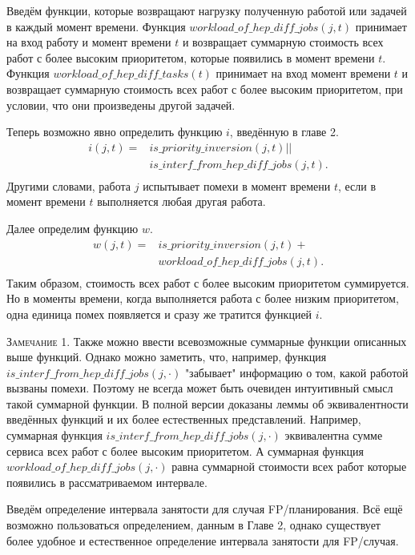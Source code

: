 Введём функции, которые возвращают нагрузку полученную работой или задачей
  в каждый момент времени. Функция $workload\_of\_hep\_diff\_jobs(j,t)$ принимает на вход
  работу и момент времени $t$ и возвращает суммарную стоимость всех работ с более
  высоким приоритетом, которые появились в момент времени $t$.
  Функция $workload\_of\_hep\_diff\_tasks(t)$ принимает на вход момент времени $t$ и возвращает
  суммарную стоимость всех работ с более высоким приоритетом, при условии, что они произведены другой задачей.

Теперь возможно явно определить функцию $i$, введённую в главе 2.
  \begin{align*} i(j,t) = & is\_priority\_inversion(j, t) || \\ & is\_interf\_from\_hep\_diff\_jobs(j,t).\\
  \end{align*}
  Другими словами, работа $j$ испытывает помехи в момент времени $t$, если в момент времени
  $t$ выполняется любая другая работа.

Далее определим функцию $w$.
\begin{align*} w(j,t) = & is\_priority\_inversion(j, t) + \\ & workload\_of\_hep\_diff\_jobs(j,t).\\
\end{align*}
  Таким образом, стоимость всех работ с более высоким приоритетом суммируется.
  Но в моменты времени, когда выполняется работа с более низким приоритетом,
  одна единица помех появляется и сразу же тратится функцией $i$.

\textsc{Замечание 1.} Также можно ввести всевозможные суммарные функции описанных выше функций.
  Однако можно заметить, что, например, функция $is\_interf\_from\_hep\_diff\_jobs(j,\cdot)$
  "забывает" информацию о том, какой работой вызваны помехи.
  Поэтому не всегда может быть очевиден интуитивный смысл такой суммарной функции.
  В полной версии доказаны леммы об эквивалентности введённых функций и их более естественных представлений.
  Например, суммарная функция $is\_interf\_from\_hep\_diff\_jobs(j,\cdot)$ эквивалентна
  сумме сервиса всех работ с более высоким приоритетом. А суммарная функция
  $workload\_of\_hep\_diff\_jobs(j,\cdot)$ равна суммарной стоимости всех работ которые появились
  в рассматриваемом интервале.

Введём определение интервала занятости для случая FP\-/планирования. Всё ещё возможно
  пользоваться определением, данным в Главе 2, однако существует
  более удобное и естественное определение интервала занятости для FP\-/случая.

